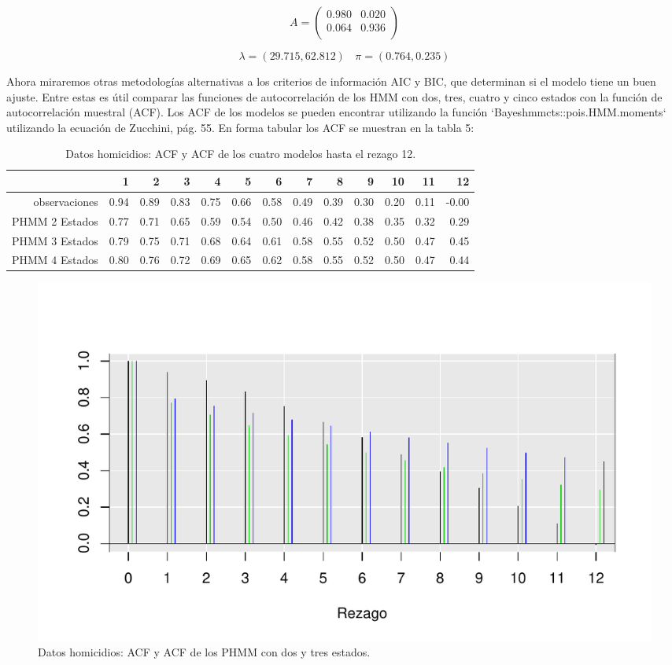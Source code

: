 \documentclass[a4paper]{article}\usepackage[]{graphicx}\usepackage[]{color}
\makeatletter
\def\maxwidth{ %
  \ifdim\Gin@nat@width>\linewidth
    \linewidth
  \else
    \Gin@nat@width
  \fi
}
\newenvironment{knitrout}{}{} %
\makeatother
\begin{document}
$$
A = \begin{pmatrix}{}
  0.980 & 0.020 \\ 
  0.064 & 0.936 \\ 
\end{pmatrix}
$$

$$\lambda = (29.715, 62.812) \ \ \ \ \pi = (0.764, 0.235)$$

Ahora miraremos otras metodologías alternativas a los criterios de información AIC y BIC, que determinan si el modelo tiene un buen ajuste. Entre estas es útil comparar las funciones de autocorrelación de los HMM con dos, tres, cuatro y cinco estados con la función de autocorrelación muestral (ACF). Los ACF de los modelos se pueden encontrar utilizando la función `Bayeshmmcts::pois.HMM.moments` utilizando la ecuación de Zucchini, pág. 55. En forma tabular los ACF se muestran en la tabla 5:

\begin{table}[ht]
\centering
\begin{tabular}{rrrrrrrrrrrrr}
  \hline
 & 1 & 2 & 3 & 4 & 5 & 6 & 7 & 8 & 9 & 10 & 11 & 12 \\ 
  \hline
observaciones & 0.94 & 0.89 & 0.83 & 0.75 & 0.66 & 0.58 & 0.49 & 0.39 & 0.30 & 0.20 & 0.11 & -0.00 \\ 
  PHMM 2 Estados & 0.77 & 0.71 & 0.65 & 0.59 & 0.54 & 0.50 & 0.46 & 0.42 & 0.38 & 0.35 & 0.32 & 0.29 \\ 
  PHMM 3 Estados & 0.79 & 0.75 & 0.71 & 0.68 & 0.64 & 0.61 & 0.58 & 0.55 & 0.52 & 0.50 & 0.47 & 0.45 \\ 
  PHMM 4 Estados & 0.80 & 0.76 & 0.72 & 0.69 & 0.65 & 0.62 & 0.58 & 0.55 & 0.52 & 0.50 & 0.47 & 0.44 \\ 
   \hline
\end{tabular}
\caption{Datos homicidios: ACF y ACF de los cuatro modelos hasta el rezago 12.} 
\end{table}


\begin{knitrout}
\color{fgcolor}\begin{figure}[h]
\includegraphics[width=\maxwidth]{figure/unnamed-chunk-15-1} \caption[Datos homicidios]{Datos homicidios: ACF y ACF de los PHMM con dos y tres estados.}\label{fig:unnamed-chunk-15}
\end{figure}


\end{knitrout}
\end{document}
